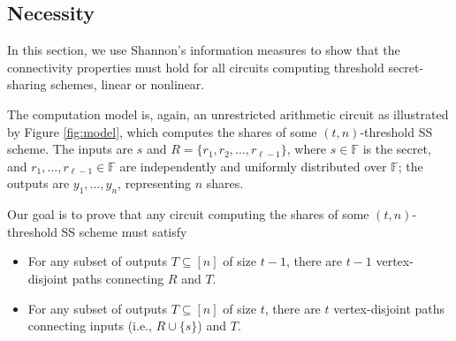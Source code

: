 \documentclass[11pt]{article}
\newcommand{\rank}{\mathrm{rank}}
\begin{document}

\subsection{Necessity}

In this section, we use Shannon's information measures to show that the connectivity properties must hold for all circuits computing threshold secret-sharing schemes, linear or nonlinear.

The computation model is, again, an unrestricted arithmetic circuit as illustrated by Figure \ref{fig:model}, which computes the shares of some $(t, n)$-threshold SS scheme. The inputs are $s$ and $R = \{r_1, r_2, \ldots, r_{\ell-1} \}$, where $s \in \mathbb{F}$ is the secret, and $r_1, \ldots, r_{\ell-1} \in \mathbb{F}$ are independently and uniformly distributed over $\mathbb{F}$; the outputs are $y_1, \ldots, y_n$, representing $n$ shares.


Our goal is to prove that any circuit computing the shares of some $(t, n)$-threshold SS scheme must satisfy
\begin{itemize}
	\item For any subset of outputs $T \subseteq [n]$ of size $t-1$, there are $t-1$ vertex-disjoint paths connecting $R$ and $T$.
	\item For any subset of outputs $T \subseteq [n]$ of size $t$, there are $t$ vertex-disjoint paths connecting inputs (i.e., $R \cup \{s\}$) and $T$.
\end{itemize}
\end{document}
